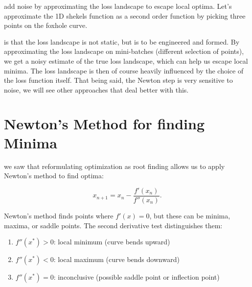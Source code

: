 add noise by approximating the loss landscape to escape local optima.
Let's approximate the 1D shekels function as a second order function by picking three points on the foxhole curve.

 is that the loss landscape is not static, but is to be engineered and formed. By approximating the loss landscape on mini-batches (different selection of points), 
we get a noisy estimate of the true loss landscape, which can help us escape local minima. The loss landscape is then of course heavily influenced by the choice of the loss function itself.
That being said, the Newton step is very sensitive to noise, we will see other approaches that deal better with this. 








\section{Newton's Method for finding Minima}


 we saw that reformulating optimization as root finding allows us to apply Newton's method to find optima:

\begin{equation}
    x_{n+1} = x_n - \frac{f'(x_n)}{f''(x_n)}.
\end{equation}

 Newton's method finds points where $f'(x) = 0$, but these can be minima, maxima, or saddle points. The second derivative test distinguishes them:
\begin{enumerate}[label=(\alph*)]
    \item $f''(x^*) > 0$: local minimum (curve bends upward)
    \item $f''(x^*) < 0$: local maximum (curve bends downward)
    \item $f''(x^*) = 0$: inconclusive (possible saddle point or inflection point)
\end{enumerate}

